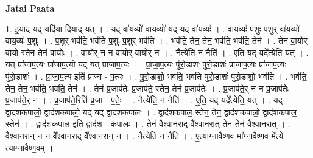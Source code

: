 \documentclass[17pt]{extarticle}
\begin{document}
\textbf{Jatai Paata} \newline

1. इ॒या॒द् यद् यदि॑या दिया॒द् यत् । . यद् वा॑य॒व्यो॑ वाय॒व्यो॑ यद् यद् वा॑य॒व्यः॑ । . वा॒य॒व्यः॑ प॒शुः प॒शुर् वा॑य॒व्यो॑ वाय॒व्यः॑ प॒शुः । . प॒शुर् भव॑ति॒ भव॑ति प॒शुः प॒शुर् भव॑ति । . भव॑ति॒ तेन॒ तेन॒ भव॑ति॒ भव॑ति॒ तेन॑ । . तेन॑ वा॒योर् वा॒यो स्तेन॒ तेन॑ वा॒योः । . वा॒योर् न न वा॒योर् वा॒योर् न । . नैत्ये॑ति॒ न नैति॑ । . ए॒ति॒ यद् यदे᳚त्येति॒ यत् । . यत् प्रा॑जाप॒त्यः प्रा॑जाप॒त्यो यद् यत् प्रा॑जाप॒त्यः । . प्रा॒जा॒प॒त्यः पु॑रो॒डाशः॑ पुरो॒डाशः॑ प्राजाप॒त्यः प्रा॑जाप॒त्यः पु॑रो॒डाशः॑ । . प्रा॒जा॒प॒त्य इति॑ प्राजा - प॒त्यः । . पु॒रो॒डाशो॒ भव॑ति॒ भव॑ति पुरो॒डाशः॑ पुरो॒डाशो॒ भव॑ति । . भव॑ति॒ तेन॒ तेन॒ भव॑ति॒ भव॑ति॒ तेन॑ । . तेन॑ प्र॒जाप॑तेः प्र॒जाप॑ते॒ स्तेन॒ तेन॑ प्र॒जाप॑तेः । . प्र॒जाप॑ते॒र् न न प्र॒जाप॑तेः प्र॒जाप॑ते॒र् न । . प्र॒जाप॑ते॒रिति॑ प्र॒जा - प॒तेः॒ । . नैत्ये॑ति॒ न नैति॑ । . ए॒ति॒ यद् यदे᳚त्येति॒ यत् । . यद् द्वाद॑शकपालो॒ द्वाद॑शकपालो॒ यद् यद् द्वाद॑शकपालः । . द्वाद॑शकपाल॒ स्तेन॒ तेन॒ द्वाद॑शकपालो॒ द्वाद॑शकपाल॒ स्तेन॑ । . द्वाद॑शकपाल॒ इति॒ द्वाद॑श - क॒पा॒लः॒ । . तेन॑ वैश्वान॒राद् वै᳚श्वान॒रात् तेन॒ तेन॑ वैश्वान॒रात् । . वै॒श्वा॒न॒रान् न न वै᳚श्वान॒राद् वै᳚श्वान॒रान् न । . नैत्ये॑ति॒ न नैति॑ । . ए॒त्या॒ग्ना॒वै॒ष्ण॒व मा᳚ग्नावैष्ण॒व मे᳚त्ये त्याग्नावैष्ण॒वम् । \newline
\end{document}
